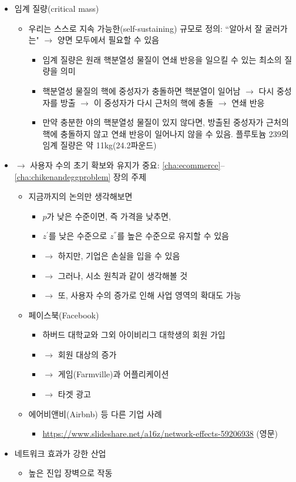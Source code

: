 \begin{itemize}
\item 임계 질량(critical mass)
	\begin{itemize}
	\item 우리는 스스로 지속 가능한(self-sustaining) 규모로 정의: ``알아서 잘 굴러가는"  $\rightarrow$ 양면 모두에서 필요할 수 있음
		\begin{itemize}
		\item 임계 질량은 원래 핵분열성 물질이 연쇄 반응을 일으킬 수 있는 최소의 질량을 의미 
		\item 핵분열성 물질의 핵에 중성자가 충돌하면 핵분열이 일어남 $\rightarrow$ 다시 중성자를 방출 $\rightarrow$ 이 중성자가 다시 근처의 핵에 충돌 $\rightarrow$ 연쇄 반응 
		\item 만약 충분한 야의 핵분열성 물질이 있지 않다면, 방출된 중성자가 근처의 핵에 충돌하지 않고 연쇄 반응이 일어나지 않을 수 있음. 플루토늄 239의 임계 질량은 약 11kg(24.2파운드)
		\end{itemize}
	\end{itemize}	
\item $\rightarrow$ 사용자 수의 초기 확보와 유지가 중요: \ref{cha:ecommerce}--\ref{cha:chikenandeggproblem} 장의 주제
	\begin{itemize}
	\item 지금까지의 논의만 생각해보면
		\begin{itemize}
		\item $p$가 낮은 수준이면, 즉 가격을 낮추면,
		\item $z^{'}$를 낮은 수준으로 $z^{''}$를 높은 수준으로 유지할 수 있음
		\item $\rightarrow$ 하지만, 기업은 손실을 입을 수 있음
		\item $\rightarrow$ 그러나, 시소 원칙과 같이 생각해볼 것
		\item $\rightarrow$ 또, 사용자 수의 증가로 인해 사업 영역의 확대도 가능
		\end{itemize}
	\item 페이스북(Facebook)
		\begin{itemize}
		\item 하버드 대학교와 그외 아이비리그 대학생의 회원 가입
		\item $\rightarrow$ 회원 대상의 증가
		\item $\rightarrow$ 게임(Farmville)과 어플리케이션
		\item $\rightarrow$ 타겟 광고
		\end{itemize}
	\item 에어비앤비(Airbnb) 등 다른 기업 사례
		\begin{itemize}
		\item \url{https://www.slideshare.net/a16z/network-effects-59206938} (영문)
		\end{itemize}	
	\end{itemize}
\item 네트워크 효과가 강한 산업
	\begin{itemize}
	\item 높은 진입 장벽으로 작동 
	\end{itemize}
\end{itemize}

